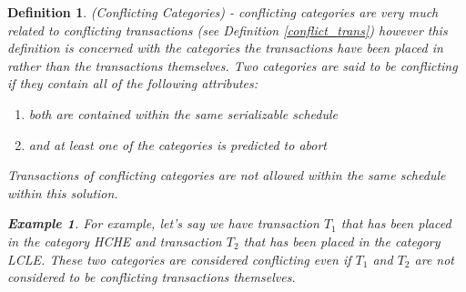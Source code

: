 \documentclass[conference]{IEEEtran}
\newtheorem{definition}{Definition}
\newtheorem{example}{Example}[definition]
\begin{document}
\begin{definition}
\label{conflict_cat}
  (Conflicting Categories) - conflicting categories are very much related to conflicting transactions (see Definition \ref{conflict_trans}) however this definition is concerned with the categories the transactions have been placed in rather than the transactions themselves. Two categories are said to be conflicting if they contain all of the following attributes:
  
  \begin{enumerate}
  \item both are contained within the same serializable schedule
  \item and at least one of the categories is predicted to abort
  \end{enumerate}
  
Transactions of conflicting categories are not allowed within the same schedule within this solution.  
  
  \begin{example}
  For example, let's say we have transaction $T_{1}$ that has been placed in the category HCHE and transaction $T_{2}$ that has been placed in the category LCLE. These two categories are considered conflicting even if $T_{1}$ and $T_{2}$ are not considered to be conflicting transactions themselves.
  \end{example}
  
\end{definition}



 
 
\end{document}
